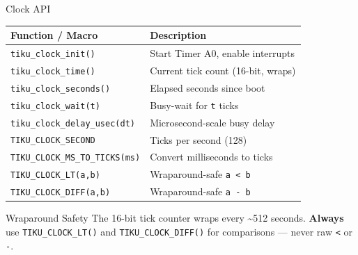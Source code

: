 \documentclass[aspectratio=169, 10pt]{beamer}
\begin{document}
\begin{frame}[fragile]{Clock API}
\begin{table}
\centering
\small
\begin{tabular}{@{}lp{7.5cm}@{}}
\toprule
\textbf{Function / Macro} & \textbf{Description} \\
\midrule
\texttt{tiku\_clock\_init()}      & Start Timer A0, enable interrupts \\
\texttt{tiku\_clock\_time()}      & Current tick count (16-bit, wraps) \\
\texttt{tiku\_clock\_seconds()}   & Elapsed seconds since boot \\
\texttt{tiku\_clock\_wait(t)}     & Busy-wait for \texttt{t} ticks \\
\texttt{tiku\_clock\_delay\_usec(dt)} & Microsecond-scale busy delay \\
\midrule
\texttt{TIKU\_CLOCK\_SECOND}        & Ticks per second (128) \\
\texttt{TIKU\_CLOCK\_MS\_TO\_TICKS(ms)} & Convert milliseconds to ticks \\
\texttt{TIKU\_CLOCK\_LT(a,b)}       & Wraparound-safe \texttt{a < b} \\
\texttt{TIKU\_CLOCK\_DIFF(a,b)}     & Wraparound-safe \texttt{a - b} \\
\bottomrule
\end{tabular}
\end{table}

\vspace{0.3em}
\begin{alertblock}{Wraparound Safety}
The 16-bit tick counter wraps every \textasciitilde512 seconds.
\textbf{Always} use \texttt{TIKU\_CLOCK\_LT()} and \texttt{TIKU\_CLOCK\_DIFF()}
for comparisons --- never raw \texttt{<} or \texttt{-}.
\end{alertblock}
\end{frame}
\end{document}
